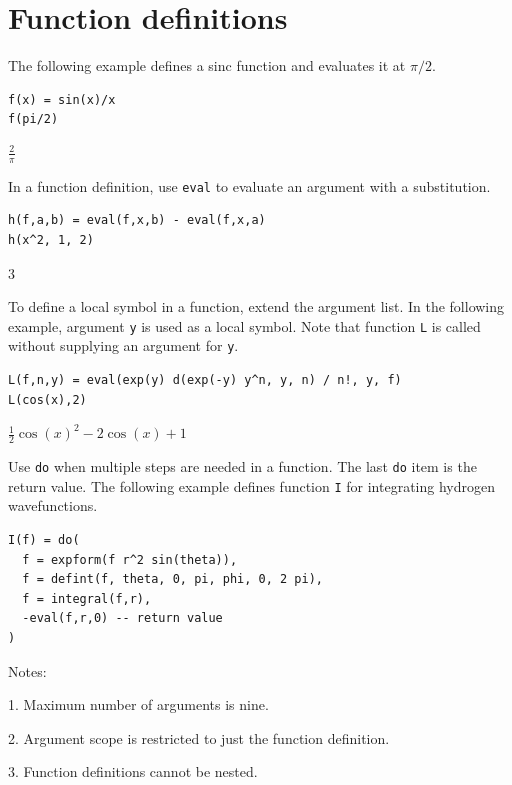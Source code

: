 
\newpage

\section{Function definitions}

The following example defines a sinc function and evaluates it at $\pi/2$.

{\color{blue}
\begin{verbatim}
f(x) = sin(x)/x
f(pi/2)
\end{verbatim}}

$\displaystyle \frac{2}{\pi}$

\bigskip
In a function definition, use \verb$eval$ to evaluate an argument with a substitution.

{\color{blue}
\begin{verbatim}
h(f,a,b) = eval(f,x,b) - eval(f,x,a)
h(x^2, 1, 2)
\end{verbatim}}

$3$

\bigskip
To define a local symbol in a function, extend the argument list.
In the following example, argument \verb$y$ is used as a local symbol.
Note that function \verb$L$ is called without supplying an argument for \verb$y$.

{\color{blue}
\begin{verbatim}
L(f,n,y) = eval(exp(y) d(exp(-y) y^n, y, n) / n!, y, f)
L(cos(x),2)
\end{verbatim}
}

$\displaystyle \tfrac{1}{2}\cos(x)^2-2\cos(x)+1$

\bigskip
Use \verb$do$ when multiple steps are needed in a function.
The last \verb$do$ item is the return value.
The following example defines function \verb$I$ for
integrating hydrogen wavefunctions.

{\color{blue}
\begin{verbatim}
I(f) = do(
  f = expform(f r^2 sin(theta)),
  f = defint(f, theta, 0, pi, phi, 0, 2 pi),
  f = integral(f,r),
  -eval(f,r,0) -- return value
)
\end{verbatim}}

Notes:

1. Maximum number of arguments is nine.

2. Argument scope is restricted to just the function definition.

3. Function definitions cannot be nested.


